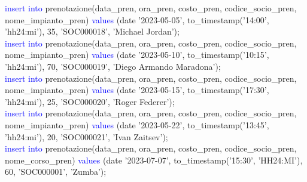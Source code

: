 \documentclass{article}
\begin{document}
\begin{flushleft}
{        \vspace{2mm}
        \hspace*{0.5em}\textcolor{blue}{insert into} prenotazione(data\_pren, ora\_pren, costo\_pren, codice\_socio\_pren, \hspace*{0.5em}nome\_impianto\_pren) \textcolor{blue}{values} (date '2023-05-05', to\_timestamp('14:00', 'hh24:mi'), \hspace*{0.5em}35, 'SOC000018', 'Michael Jordan'); \\
        \vspace{2mm}
        \hspace*{0.5em}\textcolor{blue}{insert into} prenotazione(data\_pren, ora\_pren, costo\_pren, codice\_socio\_pren, \hspace*{0.5em}nome\_impianto\_pren) \textcolor{blue}{values} (date '2023-05-10', to\_timestamp('10:15', 'hh24:mi'), \hspace*{0.5em}70, 'SOC000019', 'Diego Armando Maradona'); \\
        \vspace{2mm}
        \hspace*{0.5em}\textcolor{blue}{insert into} prenotazione(data\_pren, ora\_pren, costo\_pren, codice\_socio\_pren, \hspace*{0.5em}nome\_impianto\_pren) \textcolor{blue}{values} (date '2023-05-15', to\_timestamp('17:30', 'hh24:mi'), \hspace*{0.5em}25, 'SOC000020', 'Roger Federer'); \\
        \vspace{2mm}
        \hspace*{0.5em}\textcolor{blue}{insert into} prenotazione(data\_pren, ora\_pren, costo\_pren, codice\_socio\_pren, \hspace*{0.5em}nome\_impianto\_pren) \textcolor{blue}{values} (date '2023-05-22', to\_timestamp('13:45', 'hh24:mi'), \hspace*{0.5em}20, 'SOC000021', 'Ivan Zaitsev'); \\
        \vspace{2mm}
        \hspace*{0.5em}\textcolor{blue}{insert into} prenotazione(data\_pren, ora\_pren, costo\_pren, codice\_socio\_pren, \hspace*{0.5em}nome\_corso\_pren) \textcolor{blue}{values} (date '2023-07-07', to\_timestamp('15:30', 'HH24:MI'), 60, \hspace*{0.5em}'SOC000001', 'Zumba'); \\
        \vspace{2mm}
}
\end{flushleft}
\end{document}
